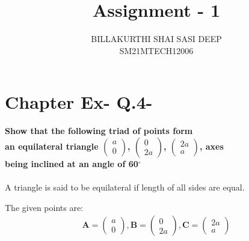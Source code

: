 \documentclass[journal,12pt,twocolumn]{IEEEtran}
\begin{document}
\newcommand{\myvec}[1]{\ensuremath{\begin{pmatrix}#1\end{pmatrix}}}
\newcommand{\cmyvec}[1]{\ensuremath{\begin{pmatrix*}[c]#1\end{pmatrix*}}}
\providecommand{\norm}[1]{\lVert#1\rVert}
\newcommand{\mydet}[1]{\ensuremath{\begin{vmatrix}#1\end{vmatrix}}}
\newcommand{\proj}[2]{\textbf{proj}_{\vec{#1}}\vec{#2}}
\newcommand{\abs}[1]{\left\lvert#1\right\rvert}
\newcommand{\RNum}[1]{\uppercase\expandafter{\romannumeral #1\relax}}
\newcommand{\Rnum}[1]{\lowercase\expandafter{\romannumeral #1\relax}}
\let\StandardTheFigure\thefigure
\let\vec\mathbf
\title{
Assignment - 1
}
\author{BILLAKURTHI SHAI SASI DEEP\\ SM21MTECH12006}
\maketitle
\newpage
\bigskip

\section*{ Chapter \RNum{2} Ex-\RNum{2} Q.4-\Rnum{3}}
\vspace{0.3cm}
\noindent
\textbf{Show that the following triad of points form
\vspace{0.3cm}\\
an equilateral triangle \myvec{a\\0}, \myvec{0\\2a}, \myvec{2a\\a}, axes 
\vspace{0.3cm}\\
being inclined at an angle of 60$^{\circ}$} \\
\\
\vspace{0.3cm}
A triangle is said to be equilateral if length of all sides are equal.
\vspace{0.6cm} 

The given points are:
\begin{align*}
\vec{A} = \myvec{a\\0}, \vec{B} =\myvec{0\\2a},
\vec{C} =\myvec{2a\\a}
\end{align*}
\end{document}
